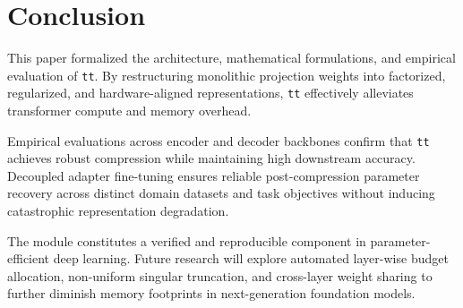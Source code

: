 \section{Conclusion}
This paper formalized the architecture, mathematical formulations, and empirical evaluation of \texttt{tt}. By restructuring monolithic projection weights into factorized, regularized, and hardware-aligned representations, \texttt{tt} effectively alleviates transformer compute and memory overhead.

Empirical evaluations across encoder and decoder backbones confirm that \texttt{tt} achieves robust compression while maintaining high downstream accuracy. Decoupled adapter fine-tuning ensures reliable post-compression parameter recovery across distinct domain datasets and task objectives without inducing catastrophic representation degradation.

The module constitutes a verified and reproducible component in parameter-efficient deep learning. Future research will explore automated layer-wise budget allocation, non-uniform singular truncation, and cross-layer weight sharing to further diminish memory footprints in next-generation foundation models.
